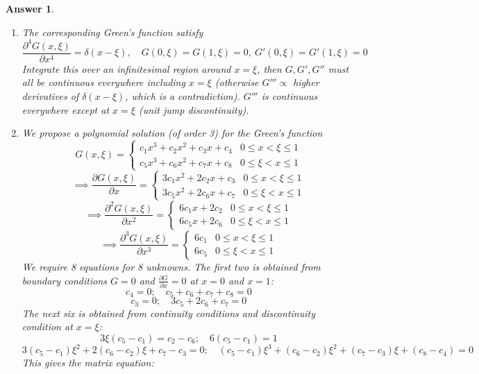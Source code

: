 \documentclass[a4paper]{article}
\newtheorem{ans}{Answer}[section]
\theoremstyle{new}
\begin{document}
\begin{ans}\leavevmode
\begin{enumerate}[label=(\roman*)]
    \item The corresponding Green's function satisfy
    $$\frac{\partial^4G(x,\xi)}{\partial x^4}=\delta(x-\xi),\quad G(0,\xi)=G(1,\xi)=0,~G'(0,\xi)=G'(1,\xi)=0$$
    Integrate this over an infinitesimal region around $x=\xi$, then $G,G',G''$ must all be continuous everywhere including $x=\xi$ (otherwise $G'''\propto$ higher derivatives of $\delta(x-\xi)$, which is a contradiction). $G'''$ is continuous everywhere except at $x=\xi$ (unit jump discontinuity).
    \item We propose a polynomial solution (of order 3) for the Green's function
    $$G(x,\xi)=
    \left\{
        \begin{array}{ll}
      c_1x^3+c_2x^2+c_3x+c_4 & 0\leq x<\xi\leq 1 \\
      c_5x^3+c_6x^2+c_7x+c_8 & 0\leq \xi<x\leq 1
        \end{array}
    \right.$$
    $$\implies\frac{\partial G(x,\xi)}{\partial x}=
    \left\{
        \begin{array}{ll}
      3c_1x^2+2c_2x+c_3 & 0\leq x<\xi\leq 1 \\
      3c_5x^2+2c_6x+c_7 & 0\leq \xi<x\leq 1
        \end{array}
    \right.$$
    $$\implies\frac{\partial^2G(x,\xi)}{\partial x^2}=
    \left\{
        \begin{array}{ll}
      6c_1x+2c_2 & 0\leq x<\xi\leq 1 \\
      6c_5x+2c_6 & 0\leq \xi<x\leq 1
        \end{array}
    \right.$$
    $$\implies\frac{\partial^3G(x,\xi)}{\partial x^3}=
    \left\{
        \begin{array}{ll}
      6c_1 & 0\leq x<\xi\leq 1 \\
      6c_5 & 0\leq \xi<x\leq 1
        \end{array}
    \right.$$
    We require 8 equations for 8 unknowns. The first two is obtained from boundary conditions $G=0$ and $\frac{\partial G}{\partial x}=0$ at $x=0$ and $x=1$:
$$c_4=0;\quad  c_5+c_6+c_7+c_8=0$$
$$c_3=0;\quad  3c_5+2c_6+c_7=0$$
The next six is obtained from continuity conditions and discontinuity condition at $x=\xi$:
$$3\xi(c_5-c_1)=c_2-c_6;\quad6(c_5-c_1)=1$$
$$3(c_5-c_1)\xi^2+2(c_6-c_2)\xi+c_7-c_3=0;\quad(c_5-c_1)\xi^3+(c_6-c_2)\xi^2+(c_7-c_3)\xi+(c_8-c_4)=0$$
This gives the matrix equation:

\end{enumerate}
\end{ans}
\end{document}
